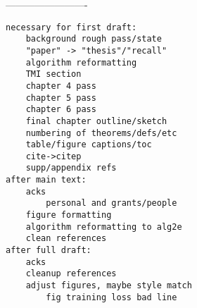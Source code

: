 -------------------------

\begin{verbatim}
necessary for first draft:
	background rough pass/state
	"paper" -> "thesis"/"recall"
	algorithm reformatting
	TMI section
	chapter 4 pass
	chapter 5 pass
	chapter 6 pass
	final chapter outline/sketch
    numbering of theorems/defs/etc
	table/figure captions/toc
	cite->citep
	supp/appendix refs
after main text:
    acks
    	personal and grants/people
    figure formatting
    algorithm reformatting to alg2e
    clean references
after full draft:
	acks
	cleanup references
	adjust figures, maybe style match
		fig training loss bad line
\end{verbatim}

